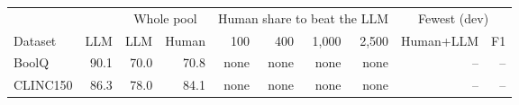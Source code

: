 \begin{tabular}{lrrrrrrrrr}
\toprule
 & & \multicolumn{2}{c}{Whole pool} & \multicolumn{4}{c}{Human share to beat the LLM} & \multicolumn{2}{c}{Fewest (dev)} \\
Dataset & LLM & LLM & Human & 100 & 400 & 1{,}000 & 2{,}500 & Human+LLM & F1 \\
\midrule
BoolQ & 90.1 & 70.0 & 70.8 & none & none & none & none & -- & -- \\
CLINC150 & 86.3 & 78.0 & 84.1 & none & none & none & none & -- & -- \\
\bottomrule
\end{tabular}
